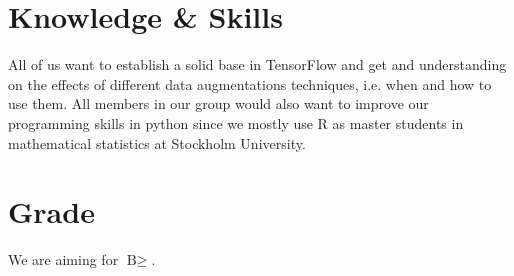 \documentclass{article}
\begin{document}
\section{Knowledge \& Skills}

All of us want to establish a solid base in TensorFlow and get and understanding on the effects of different data augmentations techniques, i.e. when and how to use them.
All members in our group would also want to improve our programming skills in python since we mostly use R as master students in mathematical statistics at Stockholm University. 

\section{Grade}

We are aiming for $\text{B}\geq$.
\end{document}
